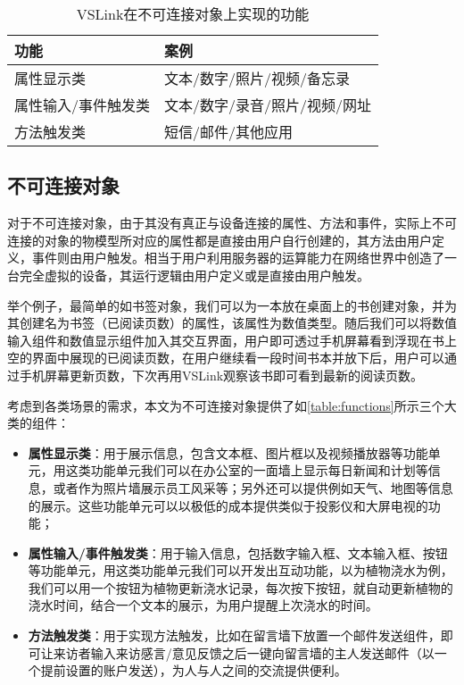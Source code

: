 \begin{table}[htbp]
	\caption{VSLink在不可连接对象上实现的功能}  \label{table:functions}  
	\begin{center}  
		\begin{tabular}{|l|l|}  
			\hline  
			\textbf{功能} & \textbf{案例} \\ \hline  
			属性显示类 & 文本/数字/照片/视频/备忘录   \\ \hline 
			属性输入/事件触发类 & 文本/数字/录音/照片/视频/网址   \\ \hline 
			方法触发类 & 短信/邮件/其他应用   \\ \hline  
		\end{tabular}  
	\end{center}  
\end{table}

\subsection{不可连接对象}
对于不可连接对象，由于其没有真正与设备连接的属性、方法和事件，实际上不可连接的对象的物模型所对应的属性都是直接由用户自行创建的，其方法由用户定义，事件则由用户触发。相当于用户利用服务器的运算能力在网络世界中创造了一台完全虚拟的设备，其运行逻辑由用户定义或是直接由用户触发。

举个例子，最简单的如书签对象，我们可以为一本放在桌面上的书创建对象，并为其创建名为书签（已阅读页数）的属性，该属性为数值类型。随后我们可以将数值输入组件和数值显示组件加入其交互界面，用户即可透过手机屏幕看到浮现在书上空的界面中展现的已阅读页数，在用户继续看一段时间书本并放下后，用户可以通过手机屏幕更新页数，下次再用VSLink观察该书即可看到最新的阅读页数。

考虑到各类场景的需求，本文为不可连接对象提供了如\autoref{table:functions}所示三个大类的组件：

\begin{itemize}
	\item \textbf{属性显示类}：用于展示信息，包含文本框、图片框以及视频播放器等功能单元，用这类功能单元我们可以在办公室的一面墙上显示每日新闻和计划等信息，或者作为照片墙展示员工风采等；另外还可以提供例如天气、地图等信息的展示。这些功能单元可以以极低的成本提供类似于投影仪和大屏电视的功能；
	\item \textbf{属性输入/事件触发类}：用于输入信息，包括数字输入框、文本输入框、按钮等功能单元，用这类功能单元我们可以开发出互动功能，以为植物浇水为例，我们可以用一个按钮为植物更新浇水记录，每次按下按钮，就自动更新植物的浇水时间，结合一个文本的展示，为用户提醒上次浇水的时间。
	\item \textbf{方法触发类}：用于实现方法触发，比如在留言墙下放置一个邮件发送组件，即可让来访者输入来访感言/意见反馈之后一键向留言墙的主人发送邮件（以一个提前设置的账户发送），为人与人之间的交流提供便利。
\end{itemize}
 
